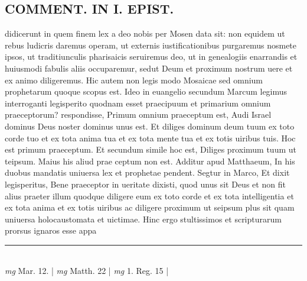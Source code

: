 \documentclass{article}
\begin{document}
\begin{pages}
\section*{COMMENT. IN I. EPIST. }\pstart didicerunt in quem finem lex a deo nobis per Mosen data sit: non equidem ut rebus ludicris daremus operam, ut externis iustificationibus purgaremus nosmete ipsos, ut traditiunculis pharisaicis seruiremus deo, ut in genealogiis enarrandis et huiusmodi fabulis aliis occuparemur, sedut Deum et proximum nostrum uere et ex animo diligeremus. Hic autem non legis modo Mosaicae sed omnium prophetarum quoque scopus est. Ideo in euangelio secundum Marcum legimus interroganti legisperito quodnam esset praecipuum et primarium omnium praeceptorum? respondisse, Primum omnium praeceptum est, Audi Israel dominus Deus noster dominus unus est. Et diliges dominum deum tuum ex toto corde tuo et ex tota anima tua et ex tota mente tua et ex totis uiribus tuis. Hoc est primum praeceptum. Et secundum simile hoc est, Diliges proximum tuum ut teipsum. Maius his aliud prae ceptum non est. Additur apud Matthaeum, In his duobus mandatis uniuersa lex et prophetae pendent. Segtur in Marco, Et dixit legisperitus, Bene praeceptor in ueritate dixisti, quod unus sit Deus et non fit alius praeter illum quodque diligere eum ex toto corde et ex tota intelligentia et ex tota anima et ex totis uiribus ac diligere proximum ut seipsum plus sit quam uniuersa holocaustomata et uictimae. Hinc ergo stultissimos et scripturarum prorsus ignaros esse appa\pend
\vspace{0.5cm}\noindent
\vspace{0.2cm}\rule{1cm}{0.2pt}\\ 
\hspace{0.2cm}\textit{mg}
\footnotesize Mar. 12. 
\normalsize| 
\hspace{0.2cm}\textit{mg}
\footnotesize Matth. 22 
\normalsize| 
\hspace{0.2cm}\textit{mg}
\footnotesize 1. Reg. 15 
\normalsize| 

\end{pages}
\end{document}
